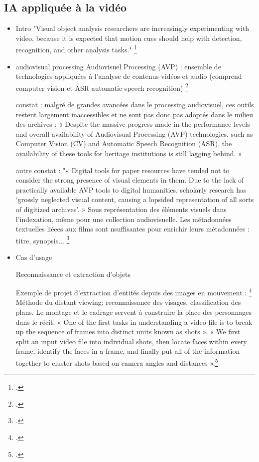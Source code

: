 \subsection{IA appliquée à la vidéo}

\begin{itemize}
	
	\item Intro
	"Visual object analysis researchers are increasingly experimenting with video, because it is expected that motion cues should help with detection, recognition, and other analysis tasks."
	\footcite{brostow2009}
	
	\item audiovisual processing 
	Audiovisuel Processing (AVP) : ensemble de technologies appliquées à l'analyse de contenus vidéos et audio (comprend computer vision et ASR automatic speech recognition) 
	\footcite{noord2021}
	
	constat : malgré de grandes avancées dans le processing audiovisuel, ces outils restent largement inaccessibles et ne sont pas donc pas adoptés dans le milieu des archives : « Despite the massive progress made in the performance levels and overall availability of Audiovisual Processing (AVP) technologies, such as Computer Vision (CV) and Automatic Speech Recognition (ASR), the availability of these tools for heritage institutions is still lagging behind. »
	
	autre constat : 
	"« Digital tools for paper resources have tended not to consider the strong presence of visual elements in them. Due to the lack of practically available AVP tools to digital humanities, scholarly research has ‘grossly neglected visual content, causing a lopsided representation of all sorts of digitized archives’. »
	Sous représentation des éléments visuels dans l'indexation, même pour une collection audiovisuelle. Les métadonnées textuelles liéees aux films sont nsuffisantes pour enrichir leurs métadonnées : titre, synopsis...
	\footcite{noord2021}


	\item Cas d'usage 
	
	\subitem Reconnaissance et extraction d'objets
	
	Exemple de projet d'extraction d'entités depuis des images en mouvement : \footcite{arnold2019}
	Méthode du distant viewing: reconnaissance des visages, classification des plans. Le montage et le cadrage servent à construire la place des personnages dans le récit. 
	« One of the first tasks in understanding a video file is to break up the sequence of frames into distinct units known as shots ».
	« We first split an input video file into individual shots, then locate faces within every frame, identify the faces in a frame, and finally put all of the information together to cluster shots based on camera angles and distances ».\footcite{arnold2019} 
	

\end{itemize}
